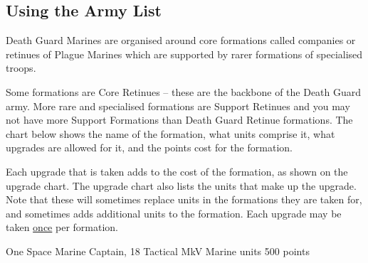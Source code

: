 \documentclass[a4paper, twocolumn]{article}
\begin{document}
\subsection{Using the Army List}
Death Guard Marines are organised around core formations
called companies or retinues of Plague Marines which are
supported by rarer formations of specialised troops.

Some formations are Core Retinues – these are the backbone
of the Death Guard army. More rare and specialised
formations are Support Retinues and you may not have more
Support Formations than Death Guard Retinue formations.
The chart below shows the name of the formation, what units
comprise it, what upgrades are allowed for it, and the points
cost for the formation.

Each upgrade that is taken adds to the cost of the formation,
as shown on the upgrade chart. The upgrade chart also lists
the units that make up the upgrade. Note that these will
sometimes replace units in the formations they are taken for,
and sometimes adds additional units to the formation. Each
upgrade may be taken \underline{once} per formation.


          {One Space Marine Captain, 18 Tactical MkV Marine units}
          {500 points}
\upgradesEND
\end{document}
